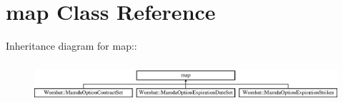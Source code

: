 \hypertarget{classstd_1_1map}{
\section{map Class Reference}
\label{classstd_1_1map}
}
Inheritance diagram for map::\begin{figure}[H]
\begin{center}
\leavevmode
\includegraphics[height=1.50538cm]{classstd_1_1map}
\end{center}
\end{figure}
